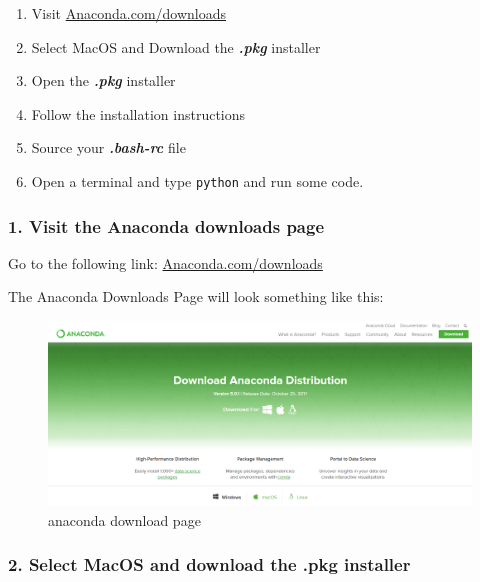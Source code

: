 \documentclass{book}
\makeatletter
\def\maxwidth{\ifdim\Gin@nat@width>\linewidth\linewidth
    \else\Gin@nat@width\fi}
\let\Oldincludegraphics\includegraphics
\renewcommand{\includegraphics}[1]{\Oldincludegraphics[width=.8\maxwidth]{#1}}
\makeatother
\begin{document}
\begin{enumerate}
\def\labelenumi{\arabic{enumi}.}
\item
  Visit
  \href{https://www.anaconda.com/download/}{Anaconda.com/downloads}
\item
  Select MacOS and Download the \textbf{\emph{.pkg}} installer
\item
  Open the \textbf{\emph{.pkg}} installer
\item
  Follow the installation instructions
\item
  Source your \textbf{\emph{.bash-rc}} file
\item
  Open a terminal and type \lstinline!python! and run some code.
\end{enumerate}
    




    
        \subsubsection{1. Visit the Anaconda downloads
page}\label{visit-the-anaconda-downloads-page}

Go to the following link:
\href{https://www.anaconda.com/download/}{Anaconda.com/downloads}

The Anaconda Downloads Page will look something like this:

\begin{figure}
\centering
\includegraphics{images/anaconda_download_page.png}
\caption{anaconda download page}
\end{figure}
    




    
        \subsubsection{2. Select MacOS and download the .pkg
installer}\label{select-macos-and-download-the-.pkg-installer}
\end{document}
